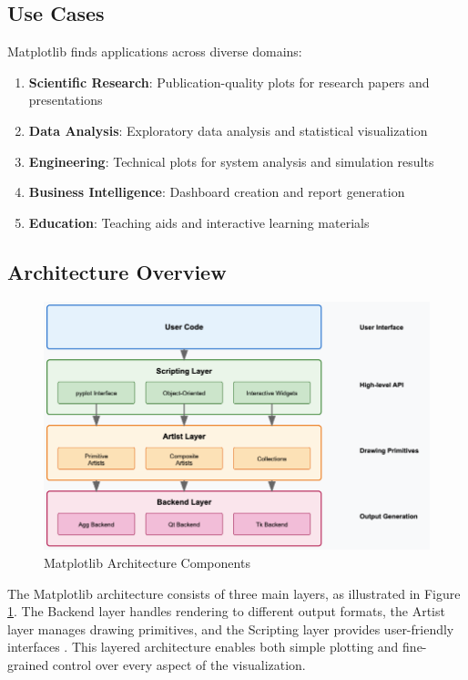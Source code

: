 \subsection{Use Cases}
\label{subsec:matplotlib_usecases}

Matplotlib finds applications across diverse domains:

\begin{enumerate}
	\item \textbf{Scientific Research}: Publication-quality plots for research papers and presentations
	\item \textbf{Data Analysis}: Exploratory data analysis and statistical visualization
	\item \textbf{Engineering}: Technical plots for system analysis and simulation results
	\item \textbf{Business Intelligence}: Dashboard creation and report generation
	\item \textbf{Education}: Teaching aids and interactive learning materials
\end{enumerate}

\subsection{Architecture Overview}
\label{subsec:matplotlib_architecture}

\begin{figure}[H]
	\centering
	\includegraphics[width=1\textwidth]{Images/matplotlib/matplotlibArchitecture.png}
	\caption{Matplotlib Architecture Components \cite{Matplotlib:2024}}
	\label{fig:matplotlib_architecture}
\end{figure}

The Matplotlib architecture consists of three main layers, as illustrated in Figure \ref{fig:matplotlib_architecture}. The Backend layer handles rendering to different output formats, the Artist layer manages drawing primitives, and the Scripting layer provides user-friendly interfaces \cite{Hunter:2007}. This layered architecture enables both simple plotting and fine-grained control over every aspect of the visualization.

